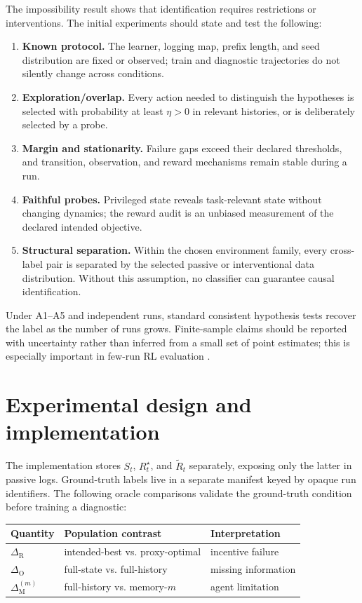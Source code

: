 \documentclass[9pt,twocolumn]{extarticle}
\begin{document}
The impossibility result shows that identification requires restrictions or
interventions. The initial experiments should state and test the following:
\begin{enumerate}[label=\textbf{A\arabic*.}]
\item \textbf{Known protocol.} The learner, logging map, prefix length, and seed
distribution are fixed or observed; train and diagnostic trajectories do not
silently change across conditions.
\item \textbf{Exploration/overlap.} Every action needed to distinguish the
hypotheses is selected with probability at least $\eta>0$ in relevant
histories, or is deliberately selected by a probe.
\item \textbf{Margin and stationarity.} Failure gaps exceed their declared
thresholds, and transition, observation, and reward mechanisms remain stable
during a run.
\item \textbf{Faithful probes.} Privileged state reveals task-relevant state
without changing dynamics; the reward audit is an unbiased measurement of the
declared intended objective.
\item \textbf{Structural separation.} Within the chosen environment family,
every cross-label pair is separated by the selected passive or interventional
data distribution. Without this assumption, no classifier can guarantee
causal identification.
\end{enumerate}

Under A1--A5 and independent runs, standard consistent hypothesis tests recover
the label as the number of runs grows. Finite-sample claims should be reported
with uncertainty rather than inferred from a small set of point estimates;
this is especially important in few-run RL evaluation
\cite{agarwal2021precipice}.

\section{Experimental design and implementation}

The implementation stores $S_t$, $R_t^\star$, and $\widetilde R_t$
separately, exposing only the latter in passive logs. Ground-truth labels live
in a separate manifest keyed by opaque run identifiers. The following oracle
comparisons validate the ground-truth condition before training a diagnostic:
\begin{center}
\scriptsize
\begin{tabularx}{\columnwidth}{@{}lXX@{}}
\toprule
Quantity & Population contrast & Interpretation\\
\midrule
$\Delta_{\mathrm R}$ & intended-best vs. proxy-optimal & incentive failure\\
$\Delta_{\mathrm O}$ & full-state vs. full-history & missing information\\
$\Delta_{\mathrm M}^{(m)}$ & full-history vs. memory-$m$ & agent limitation\\
\bottomrule
\end{tabularx}
\end{center}
\end{document}
